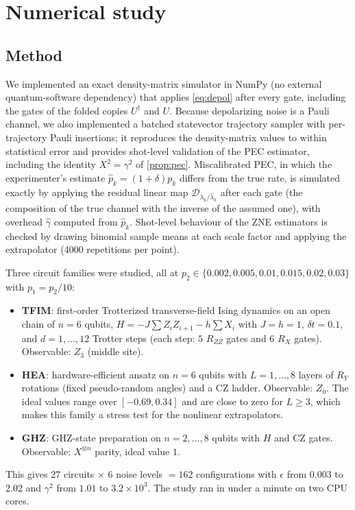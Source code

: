 \documentclass[aps,pra,reprint,amsmath,amssymb,nofootinbib,superscriptaddress]{revtex4-2}
\theoremstyle{remark}
\newcommand{\eps}{\epsilon}
\begin{document}
\section{Numerical study}
\label{sec:numerics}

\subsection{Method}
We implemented an exact density-matrix simulator in NumPy (no external quantum-software dependency) that applies \cref{eq:depol} after every gate, including the gates of the folded copies $U^\dagger$ and $U$. Because depolarizing noise is a Pauli channel, we also implemented a batched statevector trajectory sampler with per-trajectory Pauli insertions; it reproduces the density-matrix values to within statistical error and provides shot-level validation of the PEC estimator, including the identity $X^2=\gamma^2$ of \cref{prop:pec}. Miscalibrated PEC, in which the experimenter's estimate $\hat p_k=(1+\delta)p_k$ differs from the true rate, is simulated exactly by applying the residual linear map $\mathcal D_{\lambda_k/\hat\lambda_k}$ after each gate (the composition of the true channel with the inverse of the assumed one), with overhead $\hat\gamma$ computed from $\hat p_k$. Shot-level behaviour of the ZNE estimators is checked by drawing binomial sample means at each scale factor and applying the extrapolator (4000 repetitions per point).

Three circuit families were studied, all at $p_2\in\{0.002,0.005,0.01,0.015,0.02,0.03\}$ with $p_1=p_2/10$:
\begin{itemize}
\item \textbf{TFIM}: first-order Trotterized transverse-field Ising dynamics on an open chain of $n=6$ qubits, $H=-J\sum Z_iZ_{i+1}-h\sum X_i$ with $J=h=1$, $\delta t=0.1$, and $d=1,\ldots,12$ Trotter steps (each step: $5$ $R_{ZZ}$ gates and $6$ $R_X$ gates). Observable: $Z_3$ (middle site).
\item \textbf{HEA}: hardware-efficient ansatz on $n=6$ qubits with $L=1,\ldots,8$ layers of $R_Y$ rotations (fixed pseudo-random angles) and a CZ ladder. Observable: $Z_0$. The ideal values range over $[-0.69,0.34]$ and are close to zero for $L\ge3$, which makes this family a stress test for the nonlinear extrapolators.
\item \textbf{GHZ}: GHZ-state preparation on $n=2,\ldots,8$ qubits with $H$ and CZ gates. Observable: $X^{\otimes n}$ parity, ideal value $1$.
\end{itemize}
This gives $27$ circuits $\times$ $6$ noise levels $=162$ configurations with $\eps$ from $0.003$ to $2.02$ and $\gamma^2$ from $1.01$ to $3.2\times10^3$. The study ran in under a minute on two CPU cores.
\end{document}
